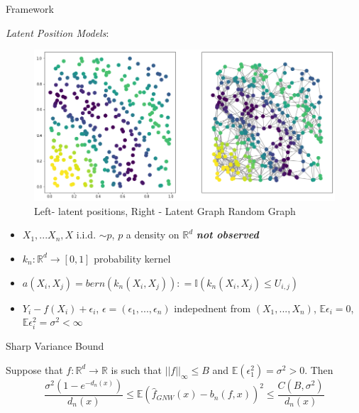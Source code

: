 \documentclass[final,dvipsnames]{beamer}
\newcommand{\mycolbackwhite}[1]{
\hspace*{.01\linewidth}\begin{minipage}{.96\linewidth}
\begin{mdframed}[backgroundcolor=white!10,linewidth=1pt]
\vspace{10pt}
#1
\vspace{10pt}
\end{mdframed}
\end{minipage}
}
\begin{document}
\begin{frame}
\begin{columns}[T]
\begin{column}{.6\textwidth}
\begin{block}{Framework}

\textit{Latent Position Models}:
\begin{figure}
    \centering
    \includegraphics[width=\textwidth]{lpm_image_correct.png}
    \caption{Left- latent positions, Right - Latent Graph Random Graph}
    \label{fig:my_label}
\end{figure}
\begin{itemize}
    \item $X_1,...X_n,X$ i.i.d. $\sim p$, $p$ a density on $\mathbb{R}^d$
    \textit{\textbf{not observed}}
    \item $k_n:\mathbb{R}^d\to [0,1]$ probability kernel 
    \item $a(X_i,X_j)=bern(k_n(X_i,X_j))\colon=\mathbb{I}(k_n(X_i,X_j)\leq U_{i,j})$
    \item $Y_i-f(X_i)+\epsilon_i$, $\epsilon=(\epsilon_1,...,\epsilon_n)$ indepednent from $(X_1,...,X_n)$, $\mathbb{E}\epsilon_i=0$, $\mathbb{E}\epsilon_i^2
    =\sigma^2<\infty$
\end{itemize}

\end{block}



\begin{block}{Sharp Variance Bound}

\mycolbackwhite{Suppose that $f\colon\mathbb{R}^d\to\mathbb{R}$ is such that $||f||_{\infty}\leq B$ and $\mathbb{E}(\epsilon_1^2)=\sigma^2>0$. Then
\begin{equation*}
    \frac{\sigma^2(1-e^{-d_n(x)})}{d_n(x)}\leq \mathbb{E}(\hat{f}_{GNW}(x)-b_n(f,x))^2\leq \frac{C(B,\sigma^2)}{d_n(x)}
\end{equation*}
}
\end{block}



\end{column}
\end{columns}
\end{frame}
\end{document}
